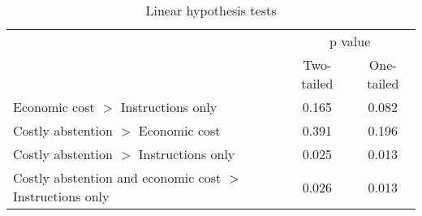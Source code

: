 \begin{table}[H]
\centering
\begin{tabular}{lcc}
\hline
                                      & \multicolumn{2}{c}{p value}       \\ \cline{2-3} 
                                      & Two-tailed & One-tailed \\ \hline
Economic cost $>$ Instructions only     & 0.165           & 0.082           \\
Costly abstention $>$ Economic cost   & 0.391           & 0.196           \\
Costly abstention $>$ Instructions only & 0.025           & 0.013           \\ 
Costly abstention and economic cost $>$ Instructions only & 0.026           & 0.013           \\ \hline
\end{tabular}
\caption{Linear hypothesis tests}
\label{tab: linearhyp}
\end{table}